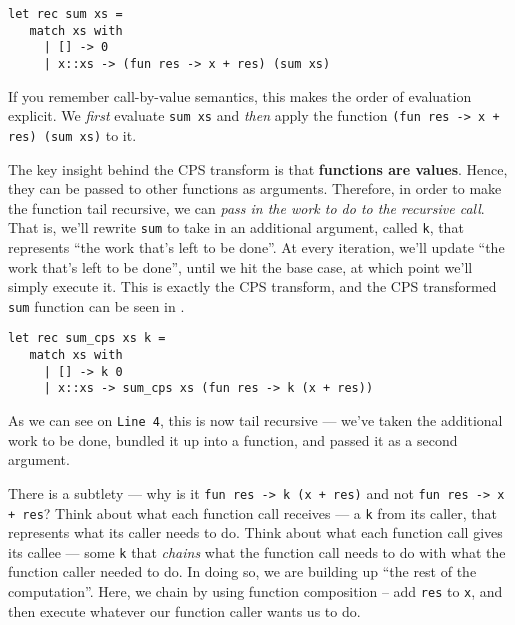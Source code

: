 \begin{code}
\label{code:sum-ocaml-explicit}
\begin{verbatim}
let rec sum xs = 
   match xs with
     | [] -> 0
     | x::xs -> (fun res -> x + res) (sum xs)
\end{verbatim}
\end{code}

If you remember call-by-value semantics, this makes the order of evaluation explicit. We \emph{first} evaluate \texttt{sum xs} and \emph{then} apply the function \texttt{(fun res -> x + res) (sum xs)} to it. 

The key insight behind the CPS transform is that \textbf{functions are values}. Hence, they can be passed to other functions as arguments. Therefore, in order to make the function tail recursive, we can \emph{pass in the work to do to the recursive call}. That is, we'll rewrite \texttt{sum} to take in an additional argument, called \texttt{k}, that represents ``the work that's left to be done''. At every iteration, we'll update ``the work that's left to be done'', until we hit the base case, at which point we'll simply execute it. This is exactly the CPS transform, and the CPS transformed \texttt{sum} function can be seen in .

\begin{code}
\label{code:sum-cps-ocaml}
\begin{verbatim}
let rec sum_cps xs k = 
   match xs with
     | [] -> k 0
     | x::xs -> sum_cps xs (fun res -> k (x + res))
\end{verbatim}
\end{code}

As we can see on \texttt{Line 4}, this is now tail recursive --- we've taken the additional work to be done, bundled it up into a function, and passed it as a second argument. 

There is a subtlety --- why is it \texttt{fun res -> k (x + res)} and not \texttt{fun res -> x + res}? Think about what each function call receives --- a \texttt{k} from its caller, that represents what its caller needs to do. Think about what each function call gives its callee --- some \texttt{k} that \emph{chains} what the function call needs to do with what the function caller needed to do. In doing so, we are building up ``the rest of the computation''. Here, we chain by using function composition -- add \texttt{res} to \texttt{x}, and then execute whatever our function caller wants us to do.

